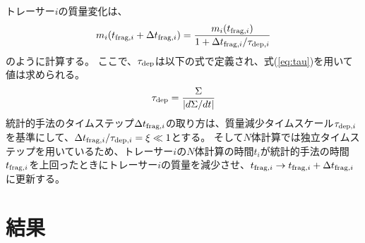 \documentclass[a4paper,10pt,oneside,twocolumn,notitlepage,final]{jarticle}
\begin{document}
トレーサー$i$の質量変化は、
\begin{align}
 m_i(t_{{\rm frag},i} + \Delta t_{{\rm frag},i}) = \frac{m_i(t_{{\rm frag},i})}{1 + \Delta t_{{\rm frag},i}/\tau_{{\rm dep},i}}
\end{align}
のように計算する。
ここで、$\tau_{\rm dep}$は以下の式で定義され、式(\ref{eq:tau})を用いて値は求められる。
\begin{align}
 \tau_{\rm dep} = \frac{\Sigma}{|d \Sigma/ dt|}
\end{align}
統計的手法のタイムステップ$\Delta t_{{\rm frag},i}$の取り方は、質量減少タイムスケール$\tau_{{\rm dep},i}$を基準にして、$\Delta t_{{\rm frag},i}/\tau_{{\rm dep},i} = \xi \ll 1$とする。
そして$N$体計算では独立タイムステップを用いているため、トレーサー$i$の$N$体計算の時間$t_i$が統計的手法の時間$t_{{\rm frag},i}$を上回ったときにトレーサー$i$の質量を減少させ、$t_{{\rm frag},i} \to t_{{\rm frag},i} + \Delta t_{{\rm frag},i}$に更新する。

\section{結果}
\end{document}
